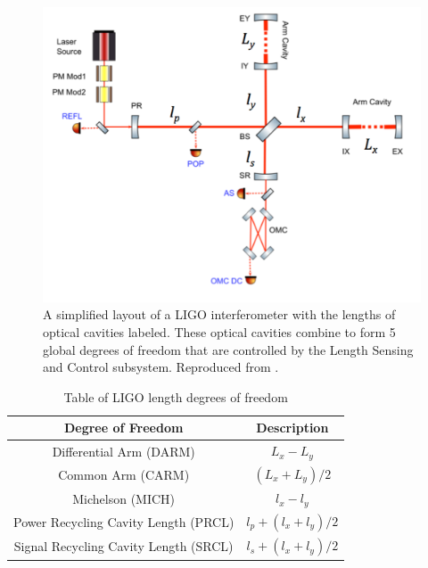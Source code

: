 \begin{figure}
\includegraphics[width=\textwidth]{figures/ODC/aligo-simple}
\caption[LIGO length degrees of freedom]{A simplified layout of a LIGO interferometer %
         with the lengths of optical cavities labeled. These optical cavities combine %
         to form 5 global degrees of freedom that are controlled by the Length Sensing %
         and Control subsystem. Reproduced from \cite{Kokeyama:detchar}.}
\label{fig:aligo-simple}
\end{figure}

\begin{table}[ht!]%
  \begin{center}
    \begin{tabular}{|c|c|}
    \hline
    Degree of Freedom & Description \\
    \hline
    Differential Arm (DARM) & $L_x - L_y$ \\
    \hline
    Common Arm (CARM) & $(L_x + L_y)/2$ \\
    \hline 
    Michelson (MICH) & $l_x - l_y$ \\
    \hline
    Power Recycling Cavity Length (PRCL) & $l_p + (l_x + l_y)/2$ \\
    \hline 
    Signal Recycling Cavity Length (SRCL) & $l_s + (l_x + l_y)/2$ \\
    \hline
    \end{tabular}
  \end{center}
  \caption[Table of LIGO degrees of freedom]{Table of LIGO length degrees of freedom}
  \label{table:aligo-dofs}
\end{table}

